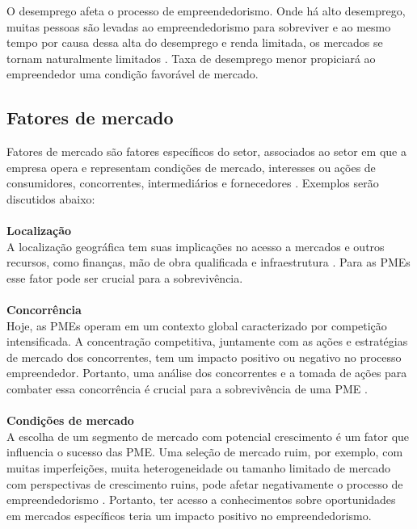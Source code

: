 O desemprego afeta o processo de empreendedorismo. Onde há alto desemprego, muitas pessoas são levadas ao empreendedorismo para sobreviver e ao mesmo tempo por causa dessa alta do desemprego e renda limitada, os mercados se tornam naturalmente limitados \cite{ligthelma.a.&cantm.c2002}. Taxa de desemprego menor propiciará ao empreendedor uma condição favorável de mercado.

\subsection{Fatores de mercado}
\label{subsec:framing}

Fatores de mercado são fatores específicos do setor, associados ao setor em que a empresa opera e representam condições de mercado, interesses ou ações de consumidores, concorrentes, intermediários e fornecedores \cite{Dahlqvist2000}. Exemplos serão discutidos abaixo:
\\
\\
\textbf{Localização}
\\

A localização geográfica tem suas implicações no acesso a mercados e outros recursos, como finanças, mão de obra qualificada e infraestrutura \cite{Dahlqvist2000}. Para as PMEs esse fator pode ser crucial para a sobrevivência.
\\
\\
\textbf{Concorrência}
\\

Hoje, as PMEs operam em um contexto global caracterizado por competição intensificada. A concentração competitiva, juntamente com as ações e estratégias de mercado dos concorrentes, tem um impacto positivo ou negativo no processo empreendedor. Portanto, uma análise dos concorrentes e a tomada de ações para combater essa concorrência é crucial para a sobrevivência de uma PME \cite{ligthelma.a.&cantm.c2002}.
\\
\\
\textbf{Condições de mercado}
\\

A escolha de um segmento de mercado com potencial crescimento é um fator que influencia o sucesso das PME. Uma seleção de mercado ruim, por exemplo, com muitas imperfeições, muita heterogeneidade ou tamanho limitado de mercado com perspectivas de crescimento ruins, pode afetar negativamente o processo de empreendedorismo \cite{vivierss.vaneedens.&venter2001}. Portanto, ter acesso a conhecimentos sobre oportunidades em mercados específicos teria um impacto positivo no empreendedorismo.


